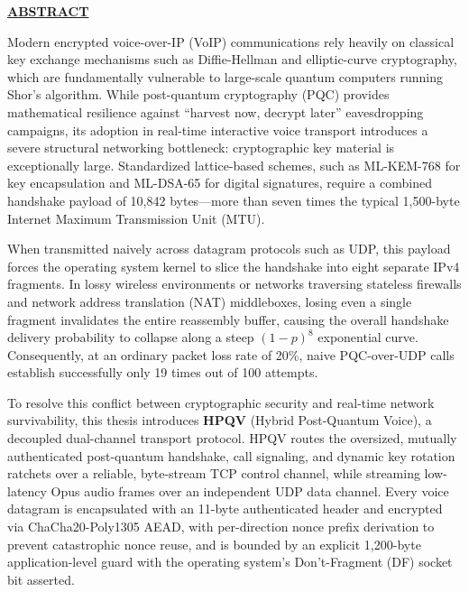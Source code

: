 \thispagestyle{plain}
\begin{center}
    {\fontsize{14}{18}\selectfont\textbf{\underline{ABSTRACT}}}\\[0.8cm]
\end{center}

{\fontsize{12}{18}\selectfont
Modern encrypted voice-over-IP (VoIP) communications rely heavily on classical key exchange mechanisms such as Diffie-Hellman and elliptic-curve cryptography, which are fundamentally vulnerable to large-scale quantum computers running Shor's algorithm. While post-quantum cryptography (PQC) provides mathematical resilience against ``harvest now, decrypt later'' eavesdropping campaigns, its adoption in real-time interactive voice transport introduces a severe structural networking bottleneck: cryptographic key material is exceptionally large. Standardized lattice-based schemes, such as ML-KEM-768 for key encapsulation and ML-DSA-65 for digital signatures, require a combined handshake payload of 10,842 bytes—more than seven times the typical 1,500-byte Internet Maximum Transmission Unit (MTU). 

When transmitted naively across datagram protocols such as UDP, this payload forces the operating system kernel to slice the handshake into eight separate IPv4 fragments. In lossy wireless environments or networks traversing stateless firewalls and network address translation (NAT) middleboxes, losing even a single fragment invalidates the entire reassembly buffer, causing the overall handshake delivery probability to collapse along a steep $(1-p)^8$ exponential curve. Consequently, at an ordinary packet loss rate of 20\%, naive PQC-over-UDP calls establish successfully only 19 times out of 100 attempts.

To resolve this conflict between cryptographic security and real-time network survivability, this thesis introduces \textbf{HPQV} (Hybrid Post-Quantum Voice), a decoupled dual-channel transport protocol. HPQV routes the oversized, mutually authenticated post-quantum handshake, call signaling, and dynamic key rotation ratchets over a reliable, byte-stream TCP control channel, while streaming low-latency Opus audio frames over an independent UDP data channel. Every voice datagram is encapsulated with an 11-byte authenticated header and encrypted via ChaCha20-Poly1305 AEAD, with per-direction nonce prefix derivation to prevent catastrophic nonce reuse, and is bounded by an explicit 1,200-byte application-level guard with the operating system's Don't-Fragment (DF) socket bit asserted.

}
